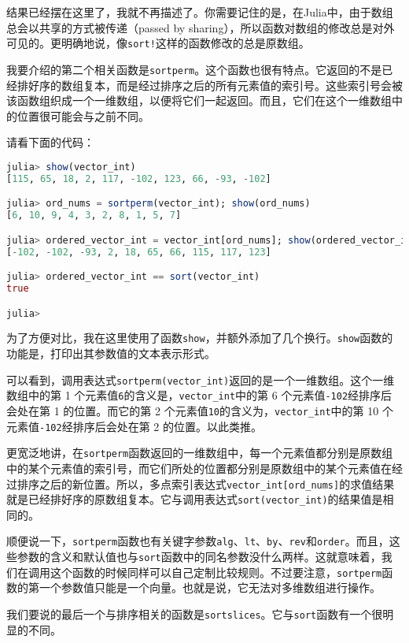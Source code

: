 结果已经摆在这里了，我就不再描述了。你需要记住的是，在Julia中，由于数组总会以共享的方式被传递（passed by sharing），所以函数对数组的修改总是对外可见的。更明确地说，像\verb|sort!|这样的函数修改的总是原数组。

我要介绍的第二个相关函数是\verb|sortperm|。这个函数也很有特点。它返回的不是已经排好序的数组复本，而是经过排序之后的所有元素值的索引号。这些索引号会被该函数组织成一个一维数组，以便将它们一起返回。而且，它们在这个一维数组中的位置很可能会与之前不同。

请看下面的代码：

\begin{lstlisting}[language=julia]
julia> show(vector_int)
[115, 65, 18, 2, 117, -102, 123, 66, -93, -102]

julia> ord_nums = sortperm(vector_int); show(ord_nums)
[6, 10, 9, 4, 3, 2, 8, 1, 5, 7]

julia> ordered_vector_int = vector_int[ord_nums]; show(ordered_vector_int)
[-102, -102, -93, 2, 18, 65, 66, 115, 117, 123]

julia> ordered_vector_int == sort(vector_int)
true

julia>
\end{lstlisting}

为了方便对比，我在这里使用了函数\verb|show|，并额外添加了几个换行。\verb|show|函数的功能是，打印出其参数值的文本表示形式。

可以看到，调用表达式\verb|sortperm(vector_int)|返回的是一个一维数组。这个一维数组中的第 1 个元素值\verb|6|的含义是，\verb|vector_int|中的第 6 个元素值\verb|-102|经排序后会处在第 1 的位置。而它的第 2 个元素值\verb|10|的含义为，\verb|vector_int|中的第 10 个元素值\verb|-102|经排序后会处在第 2 的位置。以此类推。

更宽泛地讲，在\verb|sortperm|函数返回的一维数组中，每一个元素值都分别是原数组中的某个元素值的索引号，而它们所处的位置都分别是原数组中的某个元素值在经过排序之后的新位置。所以，多点索引表达式\verb|vector_int[ord_nums]|的求值结果就是已经排好序的原数组复本。它与调用表达式\verb|sort(vector_int)|的结果值是相同的。

顺便说一下，\verb|sortperm|函数也有关键字参数\verb|alg|、\verb|lt|、\verb|by|、\verb|rev|和\verb|order|。而且，这些参数的含义和默认值也与\verb|sort|函数中的同名参数没什么两样。这就意味着，我们在调用这个函数的时候同样可以自己定制比较规则。不过要注意，\verb|sortperm|函数的第一个参数值只能是一个向量。也就是说，它无法对多维数组进行操作。

我们要说的最后一个与排序相关的函数是\verb|sortslices|。它与\verb|sort|函数有一个很明显的不同。

